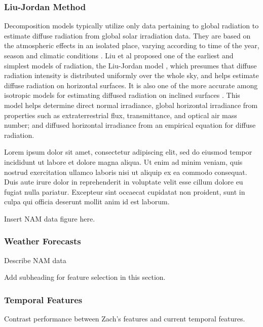 \subsubsection*{Liu-Jordan Method}
Decomposition models typically utilize only data pertaining to global radiation to estimate diffuse radiation from global solar irradiation data. They are based on the atmospheric effects in an isolated place, varying according to time of the year, season and climatic conditions \cite{pvlib_liujordan}. Liu et al proposed one of the earliest and simplest models of radiation, the Liu-Jordan model \cite{pvlib_liujordan2}, which presumes that diffuse radiation intensity is distributed uniformly over the whole sky, and helps estimate diffuse radiation on horizontal surfaces. It is also one of the more accurate among isotropic models for estimating diffused radiation on inclined surfaces \cite{pvlib_liujordan3}. This model helps determine direct normal irradiance, global horizontal irradiance from properties such as extraterrestrial flux, transmittance, and optical air mass number; and diffused horizontal irradiance from an empirical equation for diffuse radiation.

Lorem ipsum dolor sit amet, consectetur adipiscing elit, sed do eiusmod tempor incididunt ut labore et dolore magna aliqua. Ut enim ad minim veniam, quis nostrud exercitation ullamco laboris nisi ut aliquip ex ea commodo consequat. Duis aute irure dolor in reprehenderit in voluptate velit esse cillum dolore eu fugiat nulla pariatur. Excepteur sint occaecat cupidatat non proident, sunt in culpa qui officia deserunt mollit anim id est laborum.

\par Insert NAM data figure here.

\subsubsection*{Weather Forecasts}
\par Describe NAM data

\par Add subheading for feature selection in this section.


\subsubsection*{Temporal Features}
\par Contrast performance between Zach's features and current temporal features.

